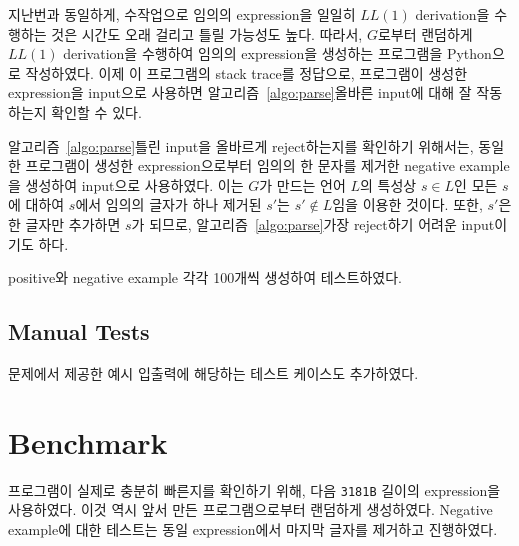 \documentclass[a4paper,10pt]{scrartcl}
\numberwithin{equation}{section}
\numberwithin{figure}{section}
\numberwithin{table}{section}
\theoremstyle{definition}
\begin{document}
지난번과 동일하게, 수작업으로 임의의 expression을 일일히 $LL(1)$ derivation을 수행하는 것은 시간도 오래 걸리고 틀릴 가능성도 높다. 따라서, $G$로부터 랜덤하게 $LL(1)$ derivation을 수행하여 임의의 expression을 생성하는 프로그램을 Python으로 작성하였다. 이제 이 프로그램의 stack trace를 정답으로, 프로그램이 생성한 expression을 input으로 사용하면 알고리즘~\ref{algo:parse}\가 올바른 input에 대해 잘 작동하는지 확인할 수 있다.

알고리즘~\ref{algo:parse}\가 틀린 input을 올바르게 reject하는지를 확인하기 위해서는, 동일한 프로그램이 생성한 expression으로부터 임의의 한 문자를 제거한 negative example을 생성하여 input으로 사용하였다. 이는 $G$가 만드는 언어 $L$의 특성상 $s \in L$인 모든 $s$에 대하여 $s$에서 임의의 글자가 하나 제거된 $s'$는 $s' \notin L$임을 이용한 것이다. 또한, $s'$은 한 글자만 추가하면 $s$가 되므로, 알고리즘~\ref{algo:parse}\가 가장 reject하기 어려운 input이기도 하다.

positive와 negative example 각각 100개씩 생성하여 테스트하였다.

\subsection{Manual Tests}

문제에서 제공한 예시 입출력에 해당하는 테스트 케이스도 추가하였다.

\section{Benchmark}

프로그램이 실제로 충분히 빠른지를 확인하기 위해, 다음 \lstinline{3181B} 길이의 expression을 사용하였다. 이것 역시 앞서 만든 프로그램으로부터 랜덤하게 생성하였다. Negative example에 대한 테스트는 동일 expression에서 마지막 글자를 제거하고 진행하였다.
\end{document}
